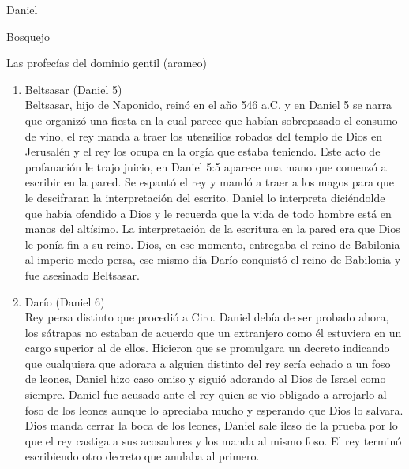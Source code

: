 \begin{section}{Daniel}
\begin{subsection}{Bosquejo}
\begin{subsubsection}{Las profecías del dominio gentil (arameo)}
\begin{enumerate}
				Estos hombres fieles fueron echados al horno y Dios los protegió, el fuego no les hizo daño. El ejemplo de fidelidad de los hombres hizo que el rey reconociera al Dios verdadero y el rey dignificó a estos hombres.\\
				\\
				Ahora el rey tiene na visión de un árbol de gran tamaño que es mandado cortar, sus adivinos y astrólogos no pueden interpretar el sueño y Daniel queda perturbado por la interpretación que Dios le da del sueño, Dios muestra la disciplina que Dios le iba a mandar al rey. El portentoso árbol era el rey mismo y aparece un santo descendiendo del cielo con la orden de que el árbol fuera cortado dejando una parte pequeña del árbol para que no muriera completamente. Ese trozo  de árbol se relaciona con las bestias del campo y dice que su corazón de hombre sería cambiado por uno de bestia. Un año después de la visión, estaba paseando el rey por su palacio y una voz del cielo llegó a sus oídos, a partir de ese momento, el rey comenzó a actuar como animal comiendo hierba del campo. En Daniel 4:34, le fue dada de vuelta la razón glorificando al altísimo como el rey de todas las edades.\\
				Los capítulos 5 y 6 ocurren después de los capítulos 7 y 8.
				\item Beltsasar (Daniel 5)\\
					Beltsasar, hijo de Naponido, reinó en el año 546 a.C. y en Daniel 5 se narra que organizó una fiesta en la cual parece que habían sobrepasado el consumo de vino, el rey manda a traer los utensilios robados del templo de Dios en Jerusalén y el rey los ocupa en la orgía que estaba teniendo. Este acto de profanación le trajo juicio, en Daniel 5:5 aparece una mano que comenzó a escribir en la pared. Se espantó el rey y mandó a traer a los magos para que le descifraran la interpretación del escrito. Daniel lo interpreta diciéndolde que había ofendido a Dios y le recuerda que la vida de todo hombre está en manos del altísimo. La interpretación de la escritura en la pared era que Dios le ponía fin a su reino. Dios, en ese momento, entregaba el reino de Babilonia al imperio medo-persa, ese mismo día Darío conquistó el reino de Babilonia y fue asesinado Beltsasar.
				\item Darío (Daniel 6)\\
					Rey persa distinto que procedió a Ciro. Daniel debía de ser probado ahora, los sátrapas no estaban de acuerdo que un extranjero como él estuviera en un cargo superior al de ellos. Hicieron que se promulgara un decreto indicando que cualquiera que adorara a alguien distinto del rey sería echado a un foso de leones, Daniel hizo caso omiso y siguió adorando al Dios de Israel como siempre. Daniel fue acusado ante el rey quien se vio obligado a arrojarlo al foso de los leones aunque lo apreciaba mucho y esperando que Dios lo salvara. Dios manda cerrar la boca de los leones, Daniel sale ileso de la prueba por lo que el rey castiga a sus acosadores y los manda al mismo foso. El rey terminó escribiendo otro decreto que anulaba al primero.

\end{enumerate}
\end{subsubsection}
\end{subsection}
\end{section}
